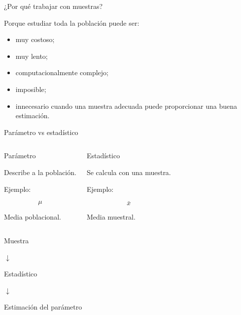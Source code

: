 \documentclass[aspectratio=169,11pt]{beamer}
\begin{document}

\begin{frame}{¿Por qué trabajar con muestras?}

Porque estudiar toda la población puede ser:

\begin{itemize}

    \item muy costoso;

    \item muy lento;

    \item computacionalmente complejo;

    \item imposible;

    \item innecesario cuando una muestra adecuada puede proporcionar una buena estimación.

\end{itemize}

\end{frame}


\begin{frame}{Parámetro vs estadístico}

\begin{columns}


\begin{block}{Parámetro}

Describe a la población.

Ejemplo:

\[
\mu
\]

Media poblacional.

\end{block}


\begin{exampleblock}{Estadístico}

Se calcula con una muestra.

Ejemplo:

\[
\bar{x}
\]

Media muestral.

\end{exampleblock}

\end{columns}

\vspace{0.5cm}

\begin{center}

Muestra

$\downarrow$

Estadístico

$\downarrow$

Estimación del parámetro

\end{center}

\end{frame}
\end{document}
